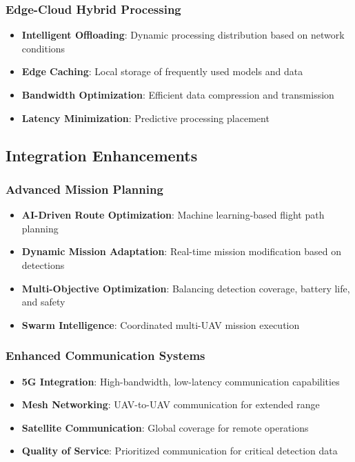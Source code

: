 \documentclass[12pt,a4paper]{article}
\begin{document}
\subsubsection{Edge-Cloud Hybrid Processing}

\begin{itemize}
    \item \textbf{Intelligent Offloading}: Dynamic processing distribution based on network conditions
    \item \textbf{Edge Caching}: Local storage of frequently used models and data
    \item \textbf{Bandwidth Optimization}: Efficient data compression and transmission
    \item \textbf{Latency Minimization}: Predictive processing placement
\end{itemize}

\subsection{Integration Enhancements}

\subsubsection{Advanced Mission Planning}

\begin{itemize}
    \item \textbf{AI-Driven Route Optimization}: Machine learning-based flight path planning
    \item \textbf{Dynamic Mission Adaptation}: Real-time mission modification based on detections
    \item \textbf{Multi-Objective Optimization}: Balancing detection coverage, battery life, and safety
    \item \textbf{Swarm Intelligence}: Coordinated multi-UAV mission execution
\end{itemize}

\subsubsection{Enhanced Communication Systems}

\begin{itemize}
    \item \textbf{5G Integration}: High-bandwidth, low-latency communication capabilities
    \item \textbf{Mesh Networking}: UAV-to-UAV communication for extended range
    \item \textbf{Satellite Communication}: Global coverage for remote operations
    \item \textbf{Quality of Service}: Prioritized communication for critical detection data
\end{itemize}
\end{document}
